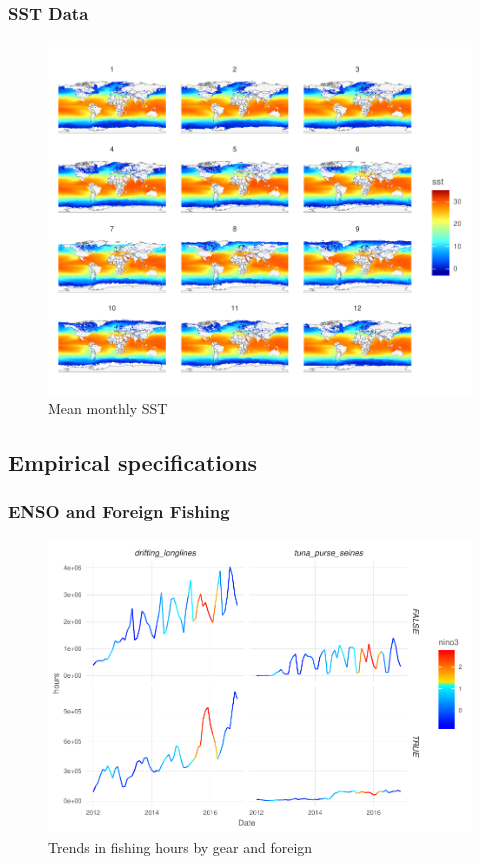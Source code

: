 \documentclass[]{article}
\begin{document}
\hypertarget{sst-data}{%
\subsubsection{SST Data}\label{sst-data}}

\begin{figure}
\centering
\includegraphics{Oremus_Villasenor-Derbez_files/figure-latex/unnamed-chunk-6-1.pdf}
\caption{Mean monthly SST}
\end{figure}

\hypertarget{empirical-specifications}{%
\subsection{Empirical specifications}\label{empirical-specifications}}

\hypertarget{enso-and-foreign-fishing}{%
\subsubsection{ENSO and Foreign
Fishing}\label{enso-and-foreign-fishing}}

\begin{figure}
\centering
\includegraphics{Oremus_Villasenor-Derbez_files/figure-latex/unnamed-chunk-7-1.pdf}
\caption{Trends in fishing hours by gear and foreign}
\end{figure}
\end{document}
